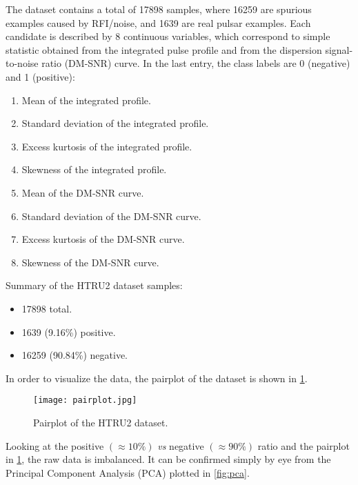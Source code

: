 The dataset contains a total of 17898 samples, where 16259 are spurious examples
caused by RFI/noise, and 1639 are real pulsar examples.
Each candidate is described by 8 continuous variables, which correspond to
simple statistic obtained from the integrated pulse profile and from the 
dispersion signal-to-noise ratio (DM-SNR) curve.
In the last entry, the class labels are 0 (negative) and 1 (positive):

\begin{multicols}{2}
    \begin{enumerate}
        \item Mean of the integrated profile.
        \item Standard deviation of the integrated profile.
        \item Excess kurtosis of the integrated profile.
        \item Skewness of the integrated profile.
        \item Mean of the DM-SNR curve.
        \item Standard deviation of the DM-SNR curve.
        \item Excess kurtosis of the DM-SNR curve.
        \item Skewness of the DM-SNR curve.
    \end{enumerate}
\end{multicols}

Summary of the HTRU2 dataset samples:

\begin{multicols}{3}
    \begin{itemize}
        \item 17898 total.
        \item 1639 (9.16\%) positive.
        \item 16259 (90.84\%) negative.
    \end{itemize}
\end{multicols}

In order to visualize the data, the pairplot of the dataset is shown in
\ref{fig:pairplot}.

\begin{figure}[b!]
    \centering
    \texttt{[image: pairplot.jpg]}
    \caption{Pairplot of the HTRU2 dataset.}
    \label{fig:pairplot}
\end{figure}

Looking at the positive $\left( \approx 10\% \right)$ \textit{vs} negative 
$\left( \approx 90\% \right)$ ratio and the pairplot in \cref{fig:pairplot},
the raw data is imbalanced.
It can be confirmed simply by eye from the Principal Component Analysis (PCA)
plotted in \cref{fig:pca}.

